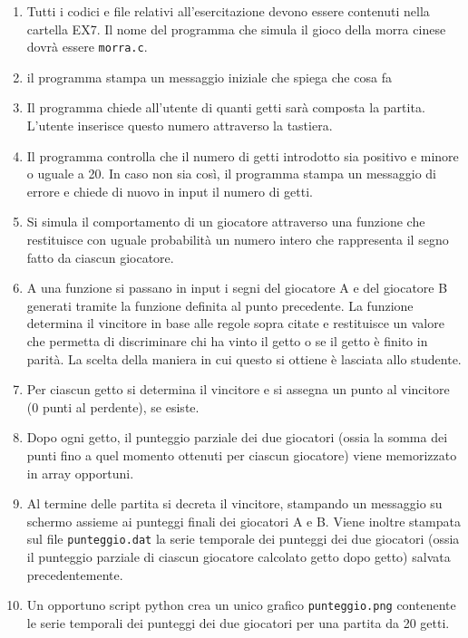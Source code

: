 \documentclass[11pt]{article}
\begin{document}
\begin{enumerate}
\item Tutti i codici e file relativi all'esercitazione devono essere contenuti nella cartella EX7. Il nome del programma che simula il gioco della morra cinese dovr\`{a} essere \texttt{morra.c}.
\item il programma stampa un messaggio iniziale che spiega che cosa fa
\item Il programma chiede all'utente di quanti getti sar\`a composta la partita.
L'utente inserisce questo numero attraverso la tastiera.
\item Il programma controlla che il numero di getti introdotto sia positivo e minore o uguale a 20. In caso non sia cos\`{i}, il programma stampa un messaggio di errore e chiede di nuovo in input il numero di getti.
\item Si simula il comportamento di un giocatore attraverso una funzione che
restituisce con uguale probabilit\`a un numero intero che rappresenta il segno
fatto da ciascun giocatore.
\item  A una funzione si passano in input i segni del giocatore A e del giocatore B generati tramite la funzione definita al punto precedente. La
funzione determina il vincitore in base alle regole sopra citate e restituisce
un valore che permetta di discriminare chi ha vinto il getto o se il getto \`e finito in parit\`a. La scelta della maniera in cui questo si ottiene \`e lasciata
allo studente. 
\item Per ciascun getto si determina il vincitore e si assegna un punto al vincitore (0 punti al perdente), se esiste.
\item Dopo ogni getto, il punteggio parziale dei due giocatori (ossia la somma dei punti fino a quel momento ottenuti per ciascun giocatore)  viene memorizzato in array opportuni.
\item Al termine delle partita si decreta il vincitore, stampando un messaggio su schermo assieme ai punteggi finali  dei giocatori A e B. Viene inoltre stampata sul file \texttt{punteggio.dat} la serie temporale dei punteggi dei due giocatori (ossia il punteggio parziale di ciascun giocatore calcolato getto dopo getto) salvata precedentemente.
\item Un opportuno script python crea un unico grafico \texttt{punteggio.png} contenente le serie temporali dei punteggi dei due giocatori per una partita da 20 getti.

\end{enumerate}
\end{document}
